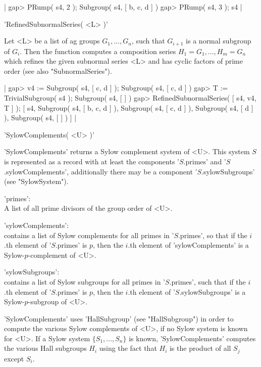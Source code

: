 |    gap> PRump( s4, 2 );
    Subgroup( s4, [ b, c, d ] )
    gap> PRump( s4, 3 );
    s4 |


'RefinedSubnormalSeries( <L> )'

Let <L> be a list of ag groups $G_1, ..., G_n$, such that  $G_{i+1}$ is a
normal  subgroup of  $G_i$.  Then  the  function  computes a  composition
series $H_1  = G_1, ...,  H_m = G_n$  which refines  the  given subnormal
series    <L> and   has    cyclic factors  of    prime  order  (see  also
"SubnormalSeries").

|    gap> v4 := Subgroup( s4, [ c, d ] );
    Subgroup( s4, [ c, d ] )
    gap> T := TrivialSubgroup( s4 );
    Subgroup( s4, [  ] )
    gap> RefinedSubnormalSeries( [ s4, v4, T ] );
    [ s4, Subgroup( s4, [ b, c, d ] ), Subgroup( s4, [ c, d ] ),
      Subgroup( s4, [ d ] ), Subgroup( s4, [  ] ) ] |


'SylowComplements( <U> )'

'SylowComplements' returns a Sylow complement system of <U>.  This system
$S$ is represented as a record with at least the  components '$S$.primes'
and  '$S$.sylowComplements',  additionally   there  may  be  a  component
'$S$.sylowSubgroups' (see "SylowSystem").

'primes': \\
        A list of all prime divisors of the group order of <U>.

'sylowComplements': \\
        contains a    list of Sylow   complements for  all   primes  in
        '$S$.primes',   so    that    if   the    $i$.th    element  of
        '$S$.primes' is    $p$,    then   the    $i$.th    element   of
        'sylowComplements' is a Sylow-$p$-complement of <U>.

'sylowSubgroups': \\
        contains  a  list  of  Sylow   subgroups   for all   primes  in
        '$S$.primes',   such     that  if   the   $i$.th   element   of
        '$S$.primes'   is    $p$,   then    the  $i$.th    element   of
        '$S$.sylowSubgroups' is a Sylow-$p$-subgroup of <U>.

'SylowComplements' uses 'HallSubgroup'  (see "HallSubgroup") in order  to
compute the various Sylow complements of <U>, if no Sylow system is known
for  <U>.  If  a    Sylow system $\{ S_1,    ...   , S_n  \}$ is   known,
'SylowComplements'  computes  the various Hall  subgroups $H_i$ using the
fact that $H_i$ is the product of all $S_j$ except $S_i$.

